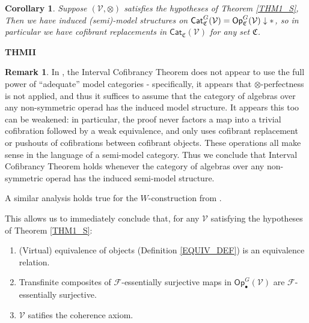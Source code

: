 \documentclass[a4paper,10pt
,draft
]{article}%
\numberwithin{equation}{section}
\numberwithin{figure}{section}
\newtheorem{corollary}[equation]{Corollary}%
\theoremstyle{definition} %
\newtheorem{remark}[equation]{Remark}%
\newcommand{\Sym}{\ensuremath{\mathsf{Sym}}}%
\newcommand{\Top}{\ensuremath{\mathsf{Top}}}
\newcommand{\Cat}{\mathsf{Cat}}
\newcommand{\Op}{\mathsf{Op}}%
\newcommand{\F}{\ensuremath{\mathcal F}}
\newcommand{\V}{\ensuremath{\mathcal V}}
\newcommand{\1}{\ensuremath{\mathbbm 1}}%
\begin{document}
\begin{corollary}
      \label{CATV_MC_COR}
      Suppose $(\V, \otimes)$ satisfies the hypotheses of Theorem \ref{THM1_S},
      Then we have induced (semi)-model structures on $\Cat^{G}_{ \mathfrak C}(\V) = \Op^{G}_{\mathfrak C}(\V) \downarrow \**$,
      so in particular we have cofibrant replacements in $\Cat_{\mathfrak C}(\V)$ for any set $\mathfrak C$.
\end{corollary}



\textbf{THMII}

\begin{remark}
      In \cite{BM13}, the Interval Cofibrancy Theorem does not appear to use the full power of ``adequate'' model categories -
      specifically, it appears that $\otimes$-perfectness is not applied,
      and thus it suffices to assume that the category of algebras over any non-symmetric operad has the induced model structure.
      It appears this too can be weakened:
      in particular, the proof never factors a map into a trivial cofibration followed by a weak equivalence,
      and only uses cofibrant replacement or pushouts of cofibrations between cofibrant objects.
      These operations all make sense in the language of a semi-model category.
      Thus we conclude that Interval Cofibrancy Theorem holds whenever the category of algebras over any non-symmetric operad has the induced semi-model structure. 

      A similar analysis holds true for the $W$-construction from \cite{BM06}.
      
      This allows us to immediately conclude that, for any $\V$ satisfying the hypotheses of Theorem \ref{THM1_S}:
      \begin{enumerate}[label=(\roman*)]
      \item (Virtual) equivalence of objects (Definition \ref{EQUIV_DEF}) is an equivalence relation.
      \item Transfinite composites of $\F$-essentially surjective maps in $\Op^G_\bullet(\V)$ are $\F$-essentially surjective.
      \item $\V$ satifies the coherence axiom.
      \end{enumerate}
\end{remark}
\end{document}

